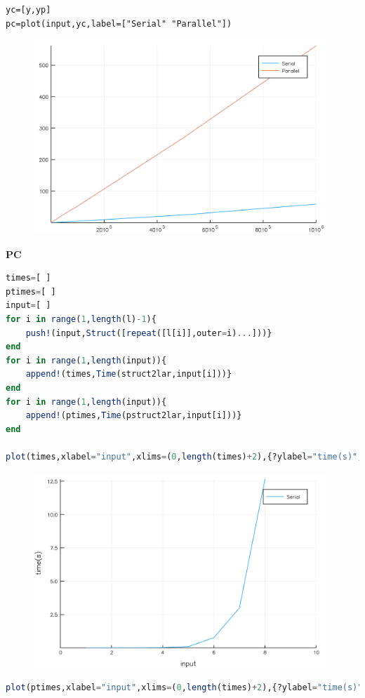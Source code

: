 \documentclass[a4paper,12pt]{article}
\begin{document}
\newpage
\begin{verbatim}
yc=[y,yp]
pc=plot(input,yc,label=["Serial" "Parallel"])
\end{verbatim}
\begin{figure}[ht!]
\centering
\includegraphics[width=11cm,scale=0.5]{compstruct2lar.png}
\end{figure}
\textbf{PC}
\begin{lstlisting}[language=Julia,format=Julia]
times=[ ]
ptimes=[ ]
input=[ ]
for i in range(1,length(l)-1){
    push!(input,Struct([repeat([l[i]],outer=i)...]))}
end
for i in range(1,length(input)){
    append!(times,Time(struct2lar,input[i]))}
end
for i in range(1,length(input)){
    append!(ptimes,Time(pstruct2lar,input[i]))}
end

plot(times,xlabel="input",xlims=(0,length(times)+2),{?ylabel="time(s)",label=["Serial"])
\end{lstlisting}
\newpage
\begin{figure}[ht!]
\centering
\includegraphics[width=11cm,scale=0.3]{struct2larSerial.png}
\end{figure}
\begin{lstlisting}[language=Julia,format=Julia]
plot(ptimes,xlabel="input",xlims=(0,length(times)+2),{?ylabel="time(s)",label=["Parallel"])
\end{lstlisting}
\end{document}
